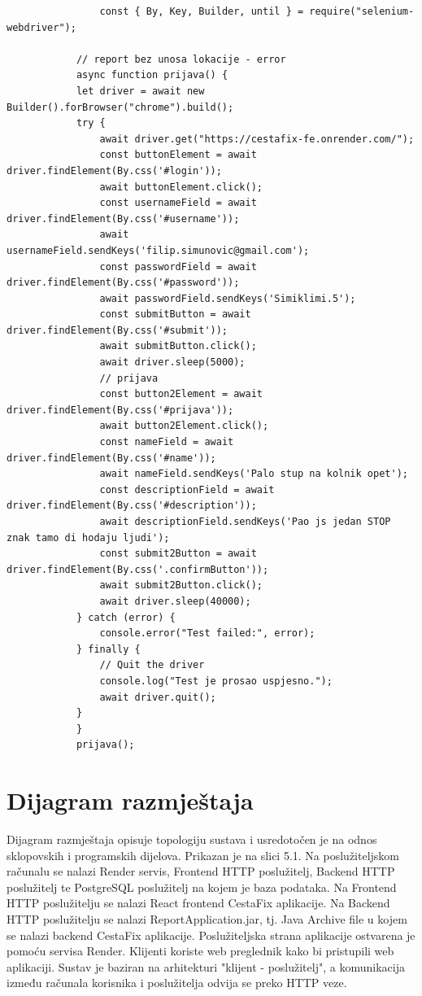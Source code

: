 			\begin{verbatim}
				const { By, Key, Builder, until } = require("selenium-webdriver");

			// report bez unosa lokacije - error
			async function prijava() {
			let driver = await new Builder().forBrowser("chrome").build();
			try {
				await driver.get("https://cestafix-fe.onrender.com/");
				const buttonElement = await driver.findElement(By.css('#login'));
				await buttonElement.click();
				const usernameField = await driver.findElement(By.css('#username'));
				await usernameField.sendKeys('filip.simunovic@gmail.com');
				const passwordField = await driver.findElement(By.css('#password'));
				await passwordField.sendKeys('Simiklimi.5');
				const submitButton = await driver.findElement(By.css('#submit'));
				await submitButton.click();
				await driver.sleep(5000);
				// prijava
				const button2Element = await driver.findElement(By.css('#prijava'));
				await button2Element.click();
				const nameField = await driver.findElement(By.css('#name'));
				await nameField.sendKeys('Palo stup na kolnik opet');
				const descriptionField = await driver.findElement(By.css('#description'));
				await descriptionField.sendKeys('Pao js jedan STOP znak tamo di hodaju ljudi');
				const submit2Button = await driver.findElement(By.css('.confirmButton'));
				await submit2Button.click();
				await driver.sleep(40000);
			} catch (error) {
				console.error("Test failed:", error);
			} finally {
				// Quit the driver
				console.log("Test je prosao uspjesno.");
				await driver.quit();
			}
			}
			prijava();
			\end{verbatim}

			
			\eject 
		
		\section{Dijagram razmještaja}
			
			Dijagram razmještaja opisuje topologiju sustava i usredotočen je na odnos sklopovskih i programskih
			dijelova. Prikazan je na slici 5.1. Na poslužiteljskom računalu se nalazi Render servis, Frontend HTTP poslužitelj, Backend HTTP 
			poslužitelj te PostgreSQL poslužitelj na kojem je baza podataka. Na Frontend HTTP poslužitelju se nalazi
			React frontend CestaFix aplikacije. Na Backend HTTP poslužitelju se nalazi ReportApplication.jar, tj. 
			Java Archive file u kojem se nalazi backend CestaFix aplikacije. Poslužiteljska strana aplikacije
			ostvarena je pomoću servisa Render. Klijenti koriste web preglednik kako bi pristupili web aplikaciji. 
			Sustav je baziran na arhitekturi "klijent - poslužitelj", a komunikacija između računala korisnika
			i poslužitelja odvija se preko HTTP veze.

